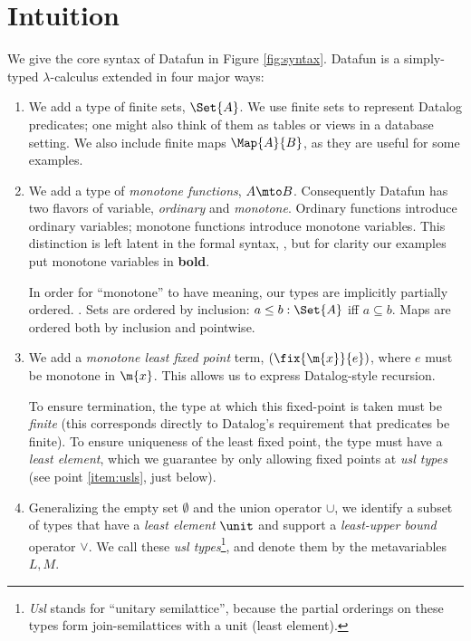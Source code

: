 \documentclass[preprint]{sigplanconf}
\begin{document}

\section{Intuition}

We give the core syntax of Datafun in Figure \ref{fig:syntax}. Datafun is a
simply-typed $\lambda$-calculus extended in four major ways:

\begin{enumerate}
\item We add a type of finite sets, $\Set{A}$. We use finite sets to represent
  Datalog predicates; one might also think of them as tables or views in a
  database setting. We also include finite maps $\Map{A}{B}$, as they are useful
  for some examples.


\item We add a type of \emph{monotone functions}, $A \mto B$. Consequently
  Datafun has two flavors of variable, \emph{ordinary} and \emph{monotone}.
  Ordinary functions introduce ordinary variables; monotone functions introduce
  monotone variables. This distinction is left latent in the formal syntax,
  , but for clarity our examples put monotone variables in
  \textbf{bold}.

  In order for ``monotone'' to have meaning, our types are implicitly partially
  ordered. . Sets are ordered by inclusion: $a \le b :
  \Set{A}$ iff $a \subseteq b$. Maps are ordered both by inclusion and
  pointwise.

\item We add a \emph{monotone least fixed point} term, $(\fix{\m{x}}{e})$,
  where $e$ must be monotone in $\m{x}$. This allows us to express
  Datalog-style recursion.


  To ensure termination, the type at which this fixed-point is taken must be
  \emph{finite} (this corresponds directly to Datalog's requirement that
  predicates be finite). To ensure uniqueness of the least fixed point, the type
  must have a \emph{least element}, which we guarantee by only allowing fixed
  points at \emph{usl types} (see point \ref{item:usls}, just below).

\item\label{item:usls} Generalizing the empty set $\emptyset$ and the union operator $\cup$, we
  identify a subset of types that have a \emph{least element} $\unit$ and
  support a \emph{least-upper bound} operator $\vee$. We call these \emph{usl
    types}\footnote{\emph{Usl} stands for ``unitary semilattice'', because the
    partial orderings on these types form join-semilattices with a unit (least
    element).}, and denote them by the metavariables $L,M$.


\end{enumerate}
\end{document}
